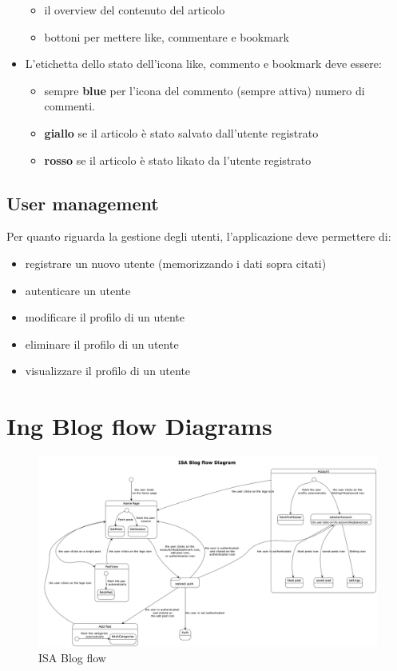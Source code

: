 \documentclass{article}
\begin{document}
\begin{itemize}
\begin{itemize}
            \item il overview del contenuto del articolo
            \item bottoni per mettere like, commentare e bookmark
        \end{itemize}
        \item L'etichetta dello stato dell'icona like, commento e bookmark deve essere:
        \begin{itemize}
            \item sempre \textbf{blue} per l'icona del commento (sempre attiva) numero di commenti.
            \item \textbf{giallo} se il articolo è stato salvato dall'utente registrato
            \item \textbf{rosso} se il articolo è stato likato da l'utente registrato
        \end{itemize}
    \end{itemize}
    \subsection{User management}

    Per quanto riguarda la gestione degli utenti, l'applicazione deve permettere di:
    \begin{itemize}
        \item registrare un nuovo utente (memorizzando i dati sopra citati)
        \item autenticare un utente
        \item modificare il profilo di un utente
        \item eliminare il profilo di un utente
        \item visualizzare il profilo di un utente
    \end{itemize}

    \clearpage
    \section{Ing Blog flow Diagrams}
    \label{sec:ing_blog_flow_diagrams}


    \begin{figure}[h]
        \centering
        \includegraphics[width=1\textwidth]{ingblog_flow}
        \caption{ISA Blog flow}
        \label{fig:figure5}
    \end{figure}
\end{document}
